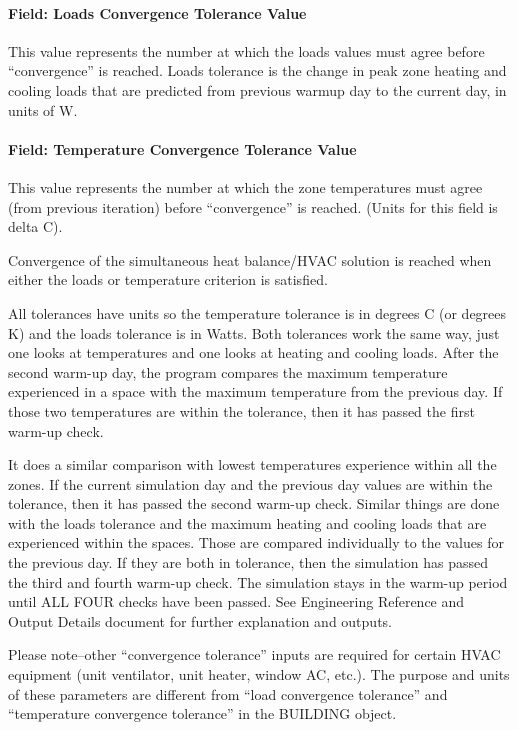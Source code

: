 \paragraph{Field: Loads Convergence Tolerance Value}\label{field-loads-convergence-tolerance-value}

This value represents the number at which the loads values must agree before ``convergence'' is reached. Loads tolerance is the change in peak zone heating and cooling loads that are predicted from previous warmup day to the current day, in units of W.

\paragraph{Field: Temperature Convergence Tolerance Value}\label{field-temperature-convergence-tolerance-value}

This value represents the number at which the zone temperatures must agree (from previous iteration) before ``convergence'' is reached. (Units for this field is delta C).

Convergence of the simultaneous heat balance/HVAC solution is reached when either the loads or temperature criterion is satisfied.

All tolerances have units so the temperature tolerance is in degrees C (or degrees K) and the loads tolerance is in Watts. Both tolerances work the same way, just one looks at temperatures and one looks at heating and cooling loads. After the second warm-up day, the program compares the maximum temperature experienced in a space with the maximum temperature from the previous day. If those two temperatures are within the tolerance, then it has passed the first warm-up check.

It does a similar comparison with lowest temperatures experience within all the zones. If the current simulation day and the previous day values are within the tolerance, then it has passed the second warm-up check. Similar things are done with the loads tolerance and the maximum heating and cooling loads that are experienced within the spaces. Those are compared individually to the values for the previous day. If they are both in tolerance, then the simulation has passed the third and fourth warm-up check. The simulation stays in the warm-up period until ALL FOUR checks have been passed. See Engineering Reference and Output Details document for further explanation and outputs.

Please note--other ``convergence tolerance'' inputs are required for certain HVAC equipment (unit ventilator, unit heater, window AC, etc.). The purpose and units of these parameters are different from ``load convergence tolerance'' and ``temperature convergence tolerance'' in the BUILDING object.

